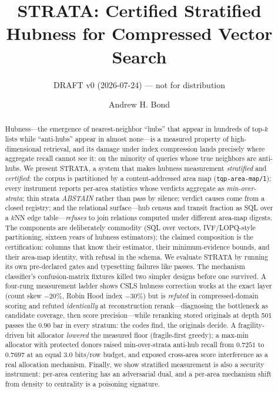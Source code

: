 \documentclass[sigconf, nonacm]{acmart}
\begin{document}
\title{STRATA: Certified Stratified Hubness for Compressed Vector Search}
\subtitle{DRAFT v0 (2026-07-24) --- not for distribution}

\author{Andrew H. Bond}

\begin{abstract}
Hubness---the emergence of nearest-neighbor ``hubs'' that appear in
hundreds of top-$k$ lists while ``anti-hubs'' appear in almost none---is a
measured property of high-dimensional retrieval, and its damage under index
compression lands precisely where aggregate recall cannot see it: on the
minority of queries whose true neighbors are anti-hubs. We present STRATA,
a system that makes hubness measurement \emph{stratified} and
\emph{certified}: the corpus is partitioned by a content-addressed area map
(\texttt{tqp-area-map/1}); every instrument reports per-area statistics
whose verdicts aggregate as \emph{min-over-strata}; thin strata
\emph{ABSTAIN} rather than pass by silence; verdict causes come from a
closed registry; and the relational surface---hub census and transit
fraction as SQL over a $k$NN edge table---\emph{refuses} to join relations
computed under different area-map digests. The components are deliberately
commodity (SQL over vectors, IVF/LOPQ-style partitioning, sixteen years of
hubness estimators); the claimed composition is the certification: columns
that know their estimator, their minimum-evidence bounds, and their
area-map identity, with refusal in the schema. We evaluate STRATA by
running its own pre-declared gates and typesetting failures like passes.
The mechanism classifier's confusion-matrix fixtures killed two simpler
designs before one survived. A four-rung measurement ladder shows CSLS
hubness correction works at the exact layer (count skew $-20\%$, Robin
Hood index $-30\%$) but is \emph{refuted} in compressed-domain scoring and
refuted \emph{identically} at reconstruction rerank---diagnosing the
bottleneck as candidate coverage, then score precision---while reranking
stored originals at depth 501 passes the $0.90$ bar in every stratum: the
codes find, the originals decide. A fragility-driven bit allocator
\emph{lowered} the measured floor (fragile-first greedy); a max-min
allocator with protected donors raised min-over-strata anti-hub recall
from $0.7251$ to $0.7697$ at an equal $3.0$ bits/row budget, and exposed
cross-area score interference as a real allocation mechanism. Finally, we
show stratified measurement is also a security instrument: per-area
centering has an adversarial dual, and a per-area mechanism shift from
density to centrality is a poisoning signature.
\end{abstract}
\end{document}

